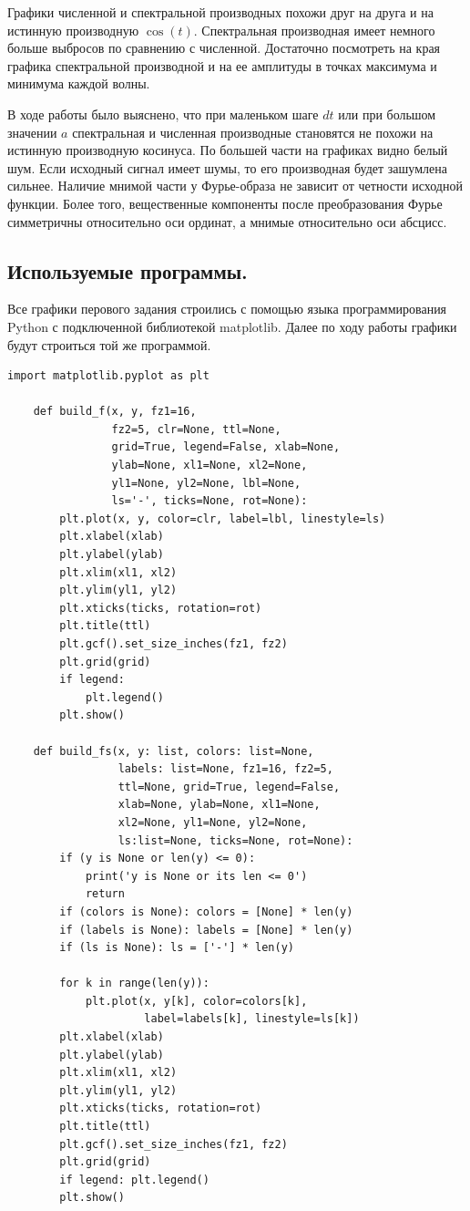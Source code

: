 \documentclass[a4paper, 12pt]{article}
\begin{document}
    Графики численной и спектральной производных похожи друг на друга и на истинную производную $\cos{(t)}$.
    Спектральная производная имеет немного больше выбросов по сравнению с численной. Достаточно посмотреть
    на края графика спектральной производной и на ее амплитуды в точках максимума и минимума каждой волны.


    В ходе работы было выяснено, что при маленьком шаге $dt$ или при большом значении $a$ спектральная и численная производные
    становятся не похожи на истинную производную косинуса. По большей части на графиках видно белый шум. Если исходный сигнал
    имеет шумы, то его производная будет зашумлена сильнее. Наличие мнимой части у Фурье-образа не зависит от четности исходной
    функции. Более того, вещественные компоненты после преобразования Фурье симметричны относительно оси ординат, а мнимые относительно
    оси абсцисс.


    \subsection{Используемые программы.}
    Все графики перового задания строились с помощью языка программирования Python с подключенной библиотекой matplotlib. Далее
    по ходу работы графики будут строиться той же программой. 
    \begin{lstlisting}[label=task1, caption={Файл с программой для построения графиков.}]
    import matplotlib.pyplot as plt

    def build_f(x, y, fz1=16,
                fz2=5, clr=None, ttl=None,
                grid=True, legend=False, xlab=None,
                ylab=None, xl1=None, xl2=None,
                yl1=None, yl2=None, lbl=None,
                ls='-', ticks=None, rot=None):
        plt.plot(x, y, color=clr, label=lbl, linestyle=ls)
        plt.xlabel(xlab)
        plt.ylabel(ylab)
        plt.xlim(xl1, xl2)
        plt.ylim(yl1, yl2)
        plt.xticks(ticks, rotation=rot)
        plt.title(ttl)
        plt.gcf().set_size_inches(fz1, fz2)
        plt.grid(grid)
        if legend:
            plt.legend()
        plt.show()
                
    def build_fs(x, y: list, colors: list=None,
                 labels: list=None, fz1=16, fz2=5,
                 ttl=None, grid=True, legend=False, 
                 xlab=None, ylab=None, xl1=None,
                 xl2=None, yl1=None, yl2=None,
                 ls:list=None, ticks=None, rot=None):
        if (y is None or len(y) <= 0):
            print('y is None or its len <= 0')
            return
        if (colors is None): colors = [None] * len(y)
        if (labels is None): labels = [None] * len(y)
        if (ls is None): ls = ['-'] * len(y)
        
        for k in range(len(y)):
            plt.plot(x, y[k], color=colors[k],
                     label=labels[k], linestyle=ls[k])
        plt.xlabel(xlab)
        plt.ylabel(ylab)
        plt.xlim(xl1, xl2)
        plt.ylim(yl1, yl2)
        plt.xticks(ticks, rotation=rot)
        plt.title(ttl)
        plt.gcf().set_size_inches(fz1, fz2)
        plt.grid(grid)
        if legend: plt.legend()
        plt.show()
    \end{lstlisting}
\end{document}
